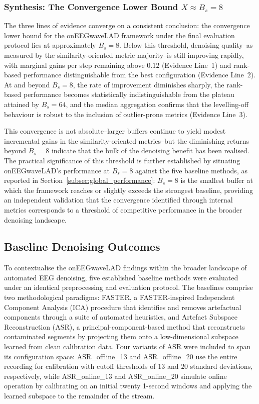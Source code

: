 \documentclass[MScCS,12pt,oneside,final]{uccthesis}
\begin{document}
\subsubsection*{Synthesis: The Convergence Lower Bound $X \approx B_s = 8$}

The three lines of evidence converge on a consistent conclusion: the convergence lower bound for the onEEGwaveLAD framework under the final evaluation protocol lies at approximately $B_s = 8$. Below this threshold, denoising quality--as measured by the similarity-oriented metric majority--is still improving rapidly, with marginal gains per step remaining above $0.12$ (Evidence Line~1) and rank-based performance distinguishable from the best configuration (Evidence Line~2). At and beyond $B_s = 8$, the rate of improvement diminishes sharply, the rank-based performance becomes statistically indistinguishable from the plateau attained by $B_s = 64$, and the median aggregation confirms that the levelling-off behaviour is robust to the inclusion of outlier-prone metrics (Evidence Line~3).

This convergence is not absolute--larger buffers continue to yield modest incremental gains in the similarity-oriented metrics--but the diminishing returns beyond $B_s = 8$ indicate that the bulk of the denoising benefit has been realised. The practical significance of this threshold is further established by situating onEEGwaveLAD's performance at $B_s = 8$ against the five baseline methods, as reported in Section~\ref{subsec:global_performance}: $B_s = 8$ is the smallest buffer at which the framework reaches or slightly exceeds the strongest baseline, providing an independent validation that the convergence identified through internal metrics corresponds to a threshold of competitive performance in the broader denoising landscape.

    \subsection{Baseline Denoising Outcomes}
\label{subsec:baseline_outcomes}

To contextualise the onEEGwaveLAD findings within the broader landscape of automated EEG denoising, five established baseline methods were evaluated under an identical preprocessing and evaluation protocol. The baselines comprise two methodological paradigms: FASTER, a FASTER-inspired Independent Component Analysis (ICA) procedure that identifies and removes artefactual components through a suite of automated heuristics, and Artefact Subspace Reconstruction (ASR), a principal-component-based method that reconstructs contaminated segments by projecting them onto a low-dimensional subspace learned from clean calibration data. Four variants of ASR were included to span its configuration space: ASR\_offline\_13 and ASR\_offline\_20 use the entire recording for calibration with cutoff thresholds of $13$ and $20$ standard deviations, respectively, while ASR\_online\_13 and ASR\_online\_20 simulate online operation by calibrating on an initial twenty 1-second windows and applying the learned subspace to the remainder of the stream.
\end{document}

